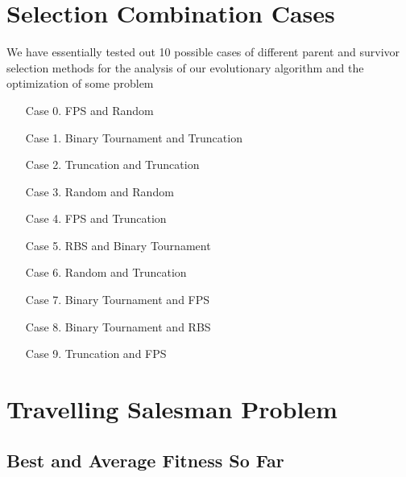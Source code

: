 \documentclass[12pt]{report} %
\begin{document}
\section{Selection Combination Cases}
We have essentially tested out 10 possible cases of different parent and survivor selection methods for the analysis of our evolutionary algorithm and the optimization of some problem
\begin{itemize}
	\item[Case 0. ] FPS and Random
	\item[Case 1. ] Binary Tournament and Truncation
	\item[Case 2. ] Truncation and Truncation
	\item[Case 3. ] Random and Random
	\item[Case 4. ] FPS and Truncation
	\item[Case 5. ] RBS and Binary Tournament
	\item[Case 6. ] Random and Truncation
	\item[Case 7. ] Binary Tournament and FPS
	\item[Case 8. ] Binary Tournament and RBS
	\item[Case 9. ] Truncation and FPS
\end{itemize}

\newpage

\section{Travelling Salesman Problem}

\subsection{Best and Average Fitness So Far}
\end{document}
